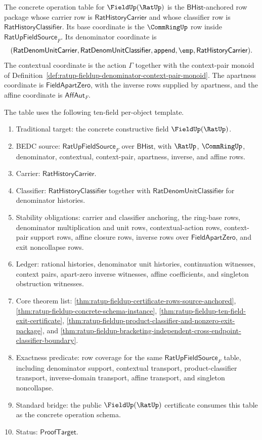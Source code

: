 \begin{definition}
\label{def:ratup-fieldup-concrete-operation-table}
The concrete operation table for $\FieldUp(\RatUp)$ is the
$\mathsf{BHist}$-anchored row package whose carrier row is
$\mathsf{RatHistoryCarrier}$ and whose classifier row is
$\mathsf{RatHistoryClassifier}$. Its base coordinate is the $\CommRingUp$ row
inside $\mathsf{RatUpFieldSource}_F$. Its denominator coordinate is
$$
(\mathsf{RatDenomUnitCarrier},\mathsf{RatDenomUnitClassifier},
\mathsf{append},\emp,\mathsf{RatHistoryCarrier}).
$$
The contextual coordinate is the action $\Gamma$ together with the
context-pair monoid of
Definition~\ref{def:ratup-fieldup-denominator-context-pair-monoid}. The
apartness coordinate is $\mathsf{FieldApartZero}$, with the inverse rows
supplied by apartness, and the affine coordinate is $\mathsf{AffAut}_F$.

The table uses the following ten-field per-object template.
\begin{enumerate}
  \item Traditional target: the concrete constructive field
  $\FieldUp(\RatUp)$.
  \item BEDC source: $\mathsf{RatUpFieldSource}_F$ over
  $\mathsf{BHist}$, with $\RatUp$, $\CommRingUp$, denominator, contextual,
  context-pair, apartness, inverse, and affine rows.
  \item Carrier: $\mathsf{RatHistoryCarrier}$.
  \item Classifier: $\mathsf{RatHistoryClassifier}$ together with
  $\mathsf{RatDenomUnitClassifier}$ for denominator histories.
  \item Stability obligations: carrier and classifier anchoring, the ring-base
  rows, denominator multiplication and unit rows, contextual-action rows,
  context-pair support rows, affine closure rows, inverse rows over
  $\mathsf{FieldApartZero}$, and exit noncollapse rows.
  \item Ledger: rational histories, denominator unit histories, continuation
  witnesses, context pairs, apart-zero inverse witnesses, affine coefficients,
  and singleton obstruction witnesses.
  \item Core theorem list:
  \autoref{thm:ratup-fieldup-certificate-rows-source-anchored},
  \autoref{thm:ratup-fieldup-concrete-schema-instance},
  \autoref{thm:ratup-fieldup-ten-field-exit-certificate},
  \autoref{thm:ratup-fieldup-product-classifier-and-nonzero-exit-package}, and
  \autoref{thm:ratup-fieldup-bracketing-independent-cross-endpoint-classifier-boundary}.
  \item Exactness predicate: row coverage for the same
  $\mathsf{RatUpFieldSource}_F$ table, including denominator support,
  contextual transport, product-classifier transport, inverse-domain transport,
  affine transport, and singleton noncollapse.
  \item Standard bridge: the public $\FieldUp(\RatUp)$ certificate consumes this
  table as the concrete operation schema.
  \item Status: $\mathsf{ProofTarget}$.
\end{enumerate}
\end{definition}

